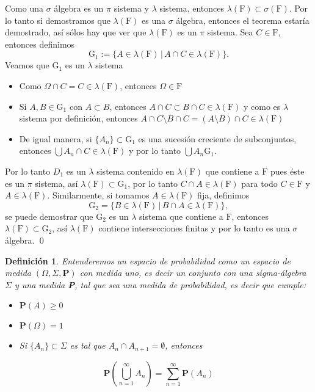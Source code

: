 \documentclass[letterpaper]{book}
\newtheorem{def.}{Definici\'on}[section]
\newcommand{\prob}{\textbf{P}}
\newcommand{\dem}{{\noindent \sc Demostraci\'on. }}
\newcommand{\om}{\ensuremath{\Omega}}
\begin{document}
\noindent\dem Como una \(\sigma\) álgebra es un \(\pi\) sistema y \(\lambda\) sistema, entonces \(\lambda(\mathrm{F})\subset\sigma(\mathrm{F})\). Por lo tanto si demostramos que \(\lambda(\mathrm{F})\) es una \(\sigma\) álgebra, entonces el teorema estaría demostrado, así sólos hay que ver que \(\lambda(\mathrm{F})\) es un \(\pi\) sistema. Sea \(C\in\mathrm{F}\), entonces definimos
\[
    \mathrm{G}_{1}:=\{A\in\lambda(\mathrm{F})\,\vert\,A\cap C\in\lambda(\mathrm{F})\}.
\]
\noindent Veamos que \(\mathrm{G}_1\) es un \(\lambda\) sistema
\begin{itemize}
\item Como \(\om\cap C=C\in\lambda(\mathrm{F})\), entonces \(\om\in\mathrm{F}\)
\item Si \(A,B\in\mathrm{G}_1\) con \(A\subset B\), entonces \(A\cap C\subset B\cap C\in\lambda(\mathrm{F})\) y como es \(\lambda\) sistema por definición, entonces \(A\cap C\setminus B\cap C=(A\setminus B)\cap C\in\lambda(\mathrm{F})\)
\item De igual manera, si  \(\{A_n\}\subset\mathrm{G}_1\) es una sucesión creciente de subconjuntos, entonces \(\bigcup A_n\cap C\in\lambda(\mathrm{F})\) y por lo tanto \(\bigcup A_n\mathrm{G}_1\).
\end{itemize}
Por lo tanto \(D_1\) es un \(\lambda\) sistema contenido en \(\lambda(\mathrm{F})\) que contiene a \(\mathrm{F}\) pues éste es un \(\pi\) sistema, así \(\lambda(\mathrm{F})\subset\mathrm{G}_1\), por lo tanto \(C\cap A\in\lambda(\mathrm{F})\) para todo \(C\in\mathrm{F}\) y \(A\in\lambda(\mathrm{F})\). Similarmente, si tomamos \(A\in\lambda(\mathrm{F})\) fija, definimos
\[
    \mathrm{G}_2=\{B\in\lambda(\mathrm{F})\,\vert\,B\cap A\in\lambda(\mathrm{F})\},
\]
\noindent se puede demostrar que \(\mathrm{G}_2\) es un \(\lambda\) sistema que contiene a \(\mathrm{F}\), entonces \(\lambda(\mathrm{F})\subset\mathrm{G}_2\), así \(\lambda(\mathrm{F})\) contiene intersecciones finitas y por lo tanto es una \(\sigma\) álgebra.
\qed\\

\begin{def.}
\noindent Entenderemos un \emph{espacio de probabilidad} como un espacio de medida \((\Omega,\Sigma,\prob)\) con medida uno, es decir un conjunto con una \emph{sigma-álgebra} \(\Sigma\) y una medida \textbf{P}, tal que sea una medida de probabilidad, es decir que cumple:

\begin{itemize}
\item \(\prob(A)\geq 0\)
\item \(\prob(\Omega)=1\)
\item Si \(\{A_n\}\subset\Sigma\) es tal que \(A_n\cap A_{n+1}=\emptyset\), entonces
\end{itemize}
\[
\prob(\bigcup_{n=1}^{\infty} A_n)=\sum_{n=1}^{\infty} \prob(A_n)
\]
\end{def.}
\end{document}
